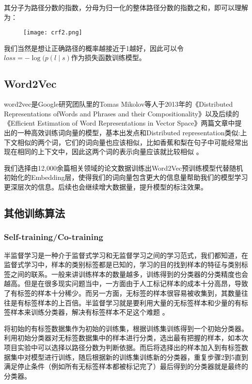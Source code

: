 \documentclass{article}
\begin{document}
其分子为路径分数的指数，分母为归一化的整体路径分数的指数之和，即可以理解为：

\begin{figure}[H]
	\centering
    \texttt{[image: crf2.png]}
    \label{fig:CRF2}
\end{figure}


我们当然是想让正确路径的概率越接近于1越好，因此可以令$loss=-\log(p(l \mid s)$作为损失函数训练模型。
\subsection{Word2Vec}
word2vec是Google研究团队里的Tomas Mikolov等人于2013年的《Distributed Representations ofWords and Phrases and their Compositionality》以及后续的《Efficient Estimation of Word Representations in Vector Space》两篇文章中提出的一种高效训练词向量的模型，基本出发点和Distributed representation类似:上下文相似的两个词，它们的词向量也应该相似，比如香蕉和梨在句子中可能经常出现在相同的上下文中，因此这两个词的表示向量应该就比较相似\cite{mikolov2013efficient} 。

我们选择由12,000余篇相关领域的论文数据训练出Word2Vec预训练模型代替随机初始化的Embedding层，使得我们的词向量包含更大的信息量帮助我们的模型学习更深层次的信息。后续也会继续增大数据量，提升模型的标注效果。
\subsection{其他训练算法}
\subsubsection{Self-training/Co-training}
半监督学习是一种介于监督式学习和无监督学习之间的学习范式，我们都知道，在监督式学习中，样本的类别标签都是已知的，学习的目的找到样本的特征与类别标签之间的联系。一般来讲训练样本的数量越多，训练得到的分类器的分类精度也会越高。但是在很多现实问题当中，一方面由于人工标记样本的成本十分高昂，导致了有标签的样本十分稀少。而另一方面，无标签的样本很容易被收集到，其数量往往是有标签样本的上百倍。半监督学习就是要利用大量的无标签样本和少量的有标签样本来训练分类器，解决有标签样本不足这个难题\cite{aryoyudanta2016semi} \cite{xie2020self}。


将初始的有标签数据集作为初始的训练集，根据训练集训练得到一个初始分类器。利用初始分类器对无标签数据集中的样本进行分类，选出最有把握的样本，如本次项目实验中可以选择以路径分数为判断依据。而后将选择出的样本加入到有标签数据集中对模型进行训练，随后根据新的训练集训练新的分类器，重复步骤2到5直到满足停止条件（例如所有无标签样本都被标记完了）最后得到的分类器就是最终的分类器。
\end{document}
